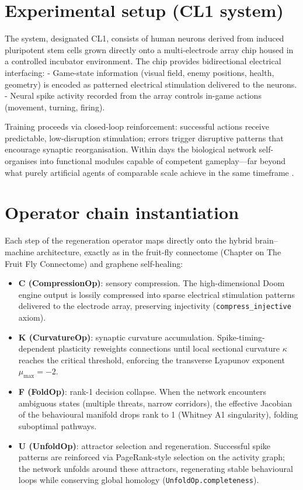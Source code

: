 \documentclass[19pt]{book}
\theoremstyle{plain}
\theoremstyle{definition}
\theoremstyle{remark}
\begin{document}
\section{Experimental setup (CL1 system)}

The system, designated CL1, consists of human neurons derived from induced pluripotent stem cells grown directly onto a multi-electrode array chip housed in a controlled incubator environment. The chip provides bidirectional electrical interfacing:
- Game-state information (visual field, enemy positions, health, geometry) is encoded as patterned electrical stimulation delivered to the neurons.
- Neural spike activity recorded from the array controls in-game actions (movement, turning, firing).

Training proceeds via closed-loop reinforcement: successful actions receive predictable, low-disruption stimulation; errors trigger disruptive patterns that encourage synaptic reorganisation. Within days the biological network self-organises into functional modules capable of competent gameplay—far beyond what purely artificial agents of comparable scale achieve in the same timeframe \citep{Hogan2026}.

\section{Operator chain instantiation}

Each step of the regeneration operator maps directly onto the hybrid brain–machine architecture, exactly as in the fruit-fly connectome (Chapter on The Fruit Fly Connectome) and graphene self-healing:

\begin{itemize}
\item \textbf{C (CompressionOp)}: sensory compression. The high-dimensional Doom engine output is lossily compressed into sparse electrical stimulation patterns delivered to the electrode array, preserving injectivity (\texttt{compress\_injective} axiom).
\item \textbf{K (CurvatureOp)}: synaptic curvature accumulation. Spike-timing-dependent plasticity reweights connections until local sectional curvature \(\kappa\) reaches the critical threshold, enforcing the transverse Lyapunov exponent \(\mu_{\max} = -2\).
\item \textbf{F (FoldOp)}: rank-1 decision collapse. When the network encounters ambiguous states (multiple threats, narrow corridors), the effective Jacobian of the behavioural manifold drops rank to 1 (Whitney A1 singularity), folding suboptimal pathways.
\item \textbf{U (UnfoldOp)}: attractor selection and regeneration. Successful spike patterns are reinforced via PageRank-style selection on the activity graph; the network unfolds around these attractors, regenerating stable behavioural loops while conserving global homology (\texttt{UnfoldOp.completeness}).
\end{itemize}
\end{document}
